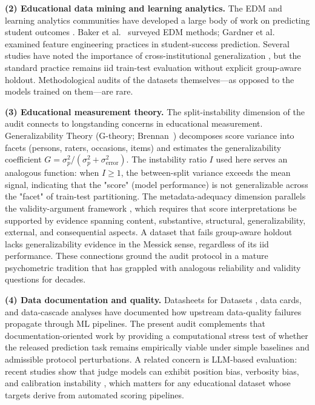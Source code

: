 \textbf{(2) Educational data mining and learning analytics.} The EDM and learning analytics communities have developed a large body of work on predicting student outcomes \citep{Romero2020}. Baker et al.~\citep{Baker2014} surveyed EDM methods; Gardner et al.~\citep{Gardner2019} examined feature engineering practices in student-success prediction. Several studies have noted the importance of cross-institutional generalization \citep{Chejara2023,Chejara2024}, but the standard practice remains iid train-test evaluation without explicit group-aware holdout. Methodological audits of the datasets themselves---as opposed to the models trained on them---are rare.

\textbf{(3) Educational measurement theory.} The split-instability dimension of the audit connects to longstanding concerns in educational measurement. Generalizability Theory (G-theory; Brennan~\citep{Brennan2001}) decomposes score variance into facets (persons, raters, occasions, items) and estimates the generalizability coefficient $G = \sigma^2_p / (\sigma^2_p + \sigma^2_{\text{error}})$. The instability ratio $I$ used here serves an analogous function: when $I \geq 1$, the between-split variance exceeds the mean signal, indicating that the "score" (model performance) is not generalizable across the "facet" of train-test partitioning. The metadata-adequacy dimension parallels the validity-argument framework \citep{Messick1995,Kane2006}, which requires that score interpretations be supported by evidence spanning content, substantive, structural, generalizability, external, and consequential aspects. A dataset that fails group-aware holdout lacks generalizability evidence in the Messick sense, regardless of its iid performance. These connections ground the audit protocol in a mature psychometric tradition that has grappled with analogous reliability and validity questions for decades.

\textbf{(4) Data documentation and quality.} Datasheets for Datasets \citep{Gebru2021}, data cards, and data-cascade analyses \citep{Sambasivan2021} have documented how upstream data-quality failures propagate through ML pipelines. The present audit complements that documentation-oriented work by providing a computational stress test of whether the released prediction task remains empirically viable under simple baselines and admissible protocol perturbations. A related concern is LLM-based evaluation: recent studies show that judge models can exhibit position bias, verbosity bias, and calibration instability \citep{Zheng2023,Wang2024,Huang2024llm}, which matters for any educational dataset whose targets derive from automated scoring pipelines.

